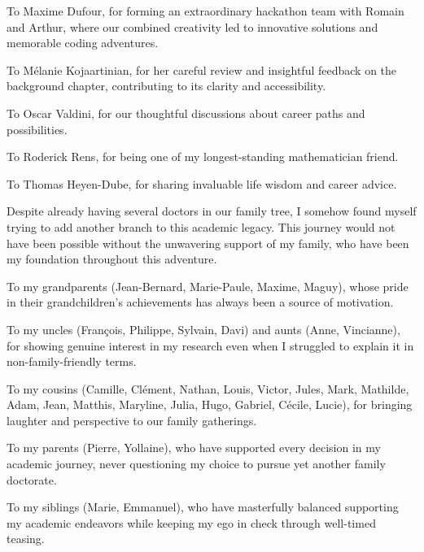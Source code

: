 To Maxime Dufour, for forming an extraordinary hackathon team with Romain and Arthur, where our combined creativity led to innovative solutions and memorable coding adventures.

To Mélanie Kojaartinian, for her careful review and insightful feedback on the background chapter, contributing to its clarity and accessibility.

To Oscar Valdini, for our thoughtful discussions about career paths and possibilities.

To Roderick Rens, for being one of my longest-standing mathematician friend.

To Thomas Heyen-Dube, for sharing invaluable life wisdom and career advice.



Despite already having several doctors in our family tree, I somehow found myself trying to add another branch to this academic legacy.
This journey would not have been possible without the unwavering support of my family, who have been my foundation throughout this adventure.

To my grandparents (Jean-Bernard, Marie-Paule, Maxime, Maguy), whose pride in their grandchildren's achievements has always been a source of motivation.

To my uncles (François, Philippe, Sylvain, Davi) and aunts (Anne, Vincianne), for showing genuine interest in my research even when I struggled to explain it in non-family-friendly terms.

To my cousins (Camille, Clément, Nathan, Louis, Victor, Jules, Mark, Mathilde, Adam, Jean, Matthis, Maryline, Julia, Hugo, Gabriel, Cécile, Lucie), for bringing laughter and perspective to our family gatherings.

To my parents (Pierre, Yollaine), who have supported every decision in my academic journey, never questioning my choice to pursue yet another family doctorate.

To my siblings (Marie, Emmanuel), who have masterfully balanced supporting my academic endeavors while keeping my ego in check through well-timed teasing.



